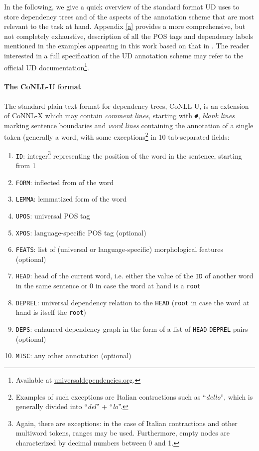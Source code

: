 In the following, we give a quick overview of the standard format UD uses to store dependency trees and of the aspects of the annotation scheme that are most relevant to the task at hand. 
Appendix \ref{a} provides a more comprehensive, but not completely exhaustive, description of all the POS tags and dependency labels mentioned in the examples appearing in this work based on that in \cite{compsyn}. 
The reader interested in a full specification of the UD annotation scheme may refer to the official UD documentation\footnote{Available at \url{universaldependencies.org}.}. 

\paragraph{The CoNLL-U format} \label{conll}
The standard plain text format for dependency trees, CoNLL-U, is an extension of CoNNL-X \cite{conllx} which may contain \textit{comment lines}, starting with \texttt{\#}, \textit{blank lines} marking sentence boundaries and \textit{word lines} containing the annotation of a single token (generally a word, with some exceptions\footnote{Examples of such exceptions are Italian contractions such as ``\textit{dello}'', which is generally divided into ``\textit{del}'' + ``\textit{lo}''.} in 10 tab-separated fields: \smallskip

\begin{enumerate}
    \item \texttt{ID}: integer\footnote{Again, there are exceptions: in the case of Italian contractions and other multiword tokens, ranges may be used. Furthermore, empty nodes are characterized by decimal numbers between 0 and 1.} representing the position of the word in the sentence, starting from 1
    \item \texttt{FORM}: inflected from of the word
    \item \texttt{LEMMA}: lemmatized form of the word
    \item \texttt{UPOS}: universal POS tag
    \item \texttt{XPOS}: language-specific POS tag (optional)
    \item \texttt{FEATS}: list of (universal or language-specific) morphological features (optional)
    \item \texttt{HEAD}: head of the current word, i.e. either the value of the \texttt{ID} of another word in the same sentence or 0 in case the word at hand is a \texttt{root}
    \item \texttt{DEPREL}: universal dependency relation to the \texttt{HEAD} (\texttt{root} in case the word at hand is itself the \texttt{root})
    \item \texttt{DEPS}: enhanced dependency graph in the form of a list of \texttt{HEAD}-\texttt{DEPREL} pairs (optional)
    \item \texttt{MISC}: any other annotation (optional)
\end{enumerate} \smallskip

